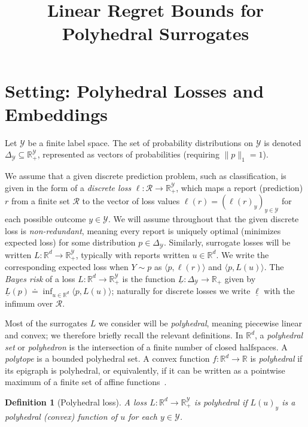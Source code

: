 \documentclass[12pt]{article}
\title{Linear Regret Bounds for Polyhedral Surrogates}
\newcommand{\reals}{\mathbb{R}}
\newcommand{\defeq}{\doteq}%
\newcommand{\simplex}{\Delta_\Y}
\newcommand{\R}{\mathcal{R}}
\newcommand{\Y}{\mathcal{Y}}
\newcommand{\risk}[1]{\underline{#1}}
\newcommand{\inprod}[2]{\langle #1, #2 \rangle}%
\newtheorem{definition}{Definition}
\begin{document}
\maketitle


\section{Setting: Polyhedral Losses and Embeddings}

Let $\Y$ be a finite label space.
The set of probability distributions on $\Y$ is denoted $\simplex\subseteq\reals^{\Y}_+$, represented as vectors of probabilities (requiring $\|p\|_1 = 1$).

We assume that a given discrete prediction problem, such as classification, is given in the form of a \emph{discrete loss} $\ell:\R\to\reals^\Y_+$, which maps a report (prediction) $r$ from a finite set $\R$ to the vector of loss values $\ell(r) = (\ell(r)_y)_{y\in\Y}$ for each possible outcome $y\in\Y$.
We will assume throughout that the given discrete loss is \emph{non-redundant}, meaning every report is uniquely optimal (minimizes expected loss) for some distribution $p\in\simplex$.
Similarly, surrogate losses will be written $L:\reals^d\to\reals^\Y_+$, typically with reports written $u\in\reals^d$.
We write the corresponding expected loss when $Y \sim p$ as $\inprod{p}{\ell(r)}$ and $\inprod{p}{L(u)}$.
The \emph{Bayes risk} of a loss $L:\reals^d\to\reals^\Y_+$ is the function $\risk{L}:\simplex\to\reals_+$ given by $\risk{L}(p) \defeq \inf_{u\in\reals^d} \inprod{p}{L(u)}$; naturally for discrete losses we write $\risk{\ell}$ with the infimum over $\R$.

Most of the surrogates $L$ we consider will be \emph{polyhedral}, meaning piecewise linear and convex; we therefore briefly recall the relevant definitions.
In $\reals^d$, a \emph{polyhedral set} or \emph{polyhedron} is the intersection of a finite number of closed halfspaces.
A \emph{polytope} is a bounded polyhedral set.
A convex function $f:\reals^d\to\reals$ is \emph{polyhedral} if its epigraph is polyhedral, or equivalently, if it can be written as a pointwise maximum of a finite set of affine functions~\cite{rockafellar1997convex}.

\begin{definition}[Polyhedral loss]
  A loss $L: \reals^d \to \reals^{\Y}_+$ is \emph{polyhedral} if $L(u)_y$ is a polyhedral (convex) function of $u$ for each $y\in\Y$.
\end{definition}
\end{document}
